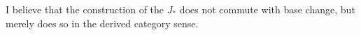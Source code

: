 I believe that the construction of the $J_*$ does not commute with base
change, but merely does so in the derived category sense.

\hand{$*\quad *$}

\hand{$\qquad *$}

